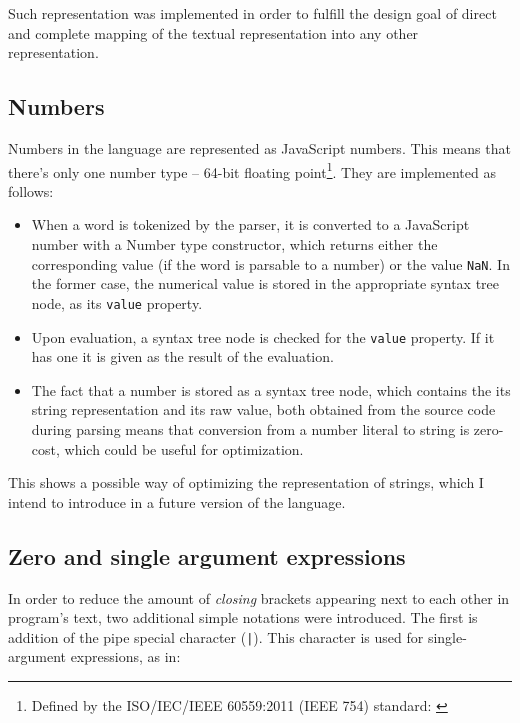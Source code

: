 Such representation was implemented in order to fulfill the design goal of
direct and complete mapping of the textual representation into any other
representation.

\subsection{Numbers}
Numbers in the language are represented as JavaScript numbers. This means that
there's only one number type -- 64-bit floating point\footnote{Defined by the
  ISO/IEC/IEEE 60559:2011 (IEEE 754) standard:
  \cite{60559_2011, js_numbers}}. They are
implemented as follows:
\begin{itemize}
    \item When a word is tokenized by the parser, it is converted to a
      JavaScript number with a Number type constructor, which returns either the
      corresponding value (if the word is parsable to a number) or the value
      \texttt{NaN}. In the former case, the numerical value is stored in the
      appropriate syntax tree node, as its \texttt{value} property.
    \item Upon evaluation, a syntax tree node is checked for the \texttt{value}
      property. If it has one it is given as the result of the evaluation.
    \item The fact that a number is stored as a syntax tree node, which contains
      the its string representation and its raw value, both obtained from the
      source code during parsing means that conversion from a number literal to
      string is zero-cost, which could be useful for optimization.
\end{itemize}

This shows a possible way of optimizing the representation of strings, which I
intend to introduce in a future version of the language.

\subsection{Zero and single argument expressions}
In order to reduce the amount of \textit{closing} brackets appearing next to
each other in program's text, two additional simple notations were
introduced. The first is addition of the pipe special character
(\texttt{|}). This character is used for single-argument expressions, as in:

